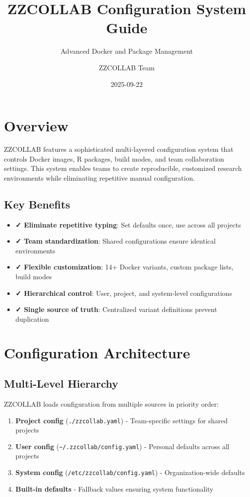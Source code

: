 \documentclass[
]{article}
\title{ZZCOLLAB Configuration System Guide}
\subtitle{Advanced Docker and Package Management}
\author{ZZCOLLAB Team}
\date{2025-09-22}
\providecommand{\tightlist}{%
  \setlength{\itemsep}{0pt}\setlength{\parskip}{0pt}}
\begin{document}
\maketitle

{
\setcounter{tocdepth}{3}
\tableofcontents
}
\section{Overview}\label{overview}

ZZCOLLAB features a sophisticated multi-layered configuration system
that controls Docker images, R packages, build modes, and team
collaboration settings. This system enables teams to create
reproducible, customized research environments while eliminating
repetitive manual configuration.

\subsection{Key Benefits}\label{key-benefits}

\begin{itemize}
\tightlist
\item
  \textbf{✓ Eliminate repetitive typing}: Set defaults once, use across
  all projects
\item
  \textbf{✓ Team standardization}: Shared configurations ensure
  identical environments
\item
  \textbf{✓ Flexible customization}: 14+ Docker variants, custom package
  lists, build modes
\item
  \textbf{✓ Hierarchical control}: User, project, and system-level
  configurations
\item
  \textbf{✓ Single source of truth}: Centralized variant definitions
  prevent duplication
\end{itemize}

\section{Configuration Architecture}\label{configuration-architecture}

\subsection{Multi-Level Hierarchy}\label{multi-level-hierarchy}

ZZCOLLAB loads configuration from multiple sources in priority order:

\begin{enumerate}
\def\labelenumi{\arabic{enumi}.}
\tightlist
\item
  \textbf{Project config} (\texttt{./zzcollab.yaml}) - Team-specific
  settings for shared projects
\item
  \textbf{User config}
  (\texttt{\textasciitilde{}/.zzcollab/config.yaml}) - Personal defaults
  across all projects
\item
  \textbf{System config} (\texttt{/etc/zzcollab/config.yaml}) -
  Organization-wide defaults
\item
  \textbf{Built-in defaults} - Fallback values ensuring system
  functionality
\end{enumerate}
\end{document}
